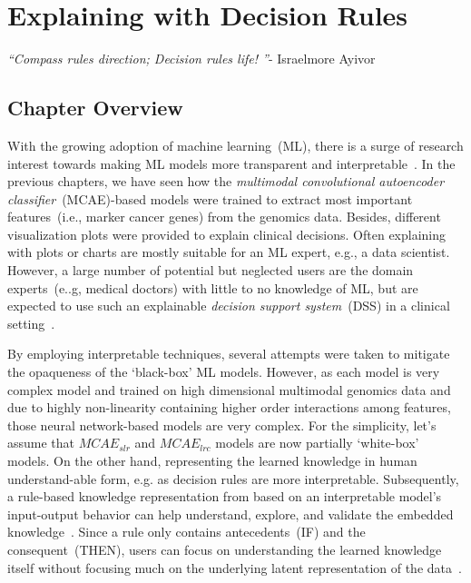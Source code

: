 \chapter{Explaining with Decision Rules}\label{chapter:xai_rules}
\textit{``Compass rules direction; Decision rules life! ''}- Israelmore Ayivor

\section{Chapter Overview} \label{chapter_7:cw}
With the growing adoption of machine learning~(ML), there is a surge of research interest towards making ML models more transparent and interpretable~\cite{ming2018rulematrix}. In the previous chapters, we have seen how the \textit{multimodal convolutional autoencoder classifier}~(MCAE)-based models were trained to extract most important features~(i.e., marker cancer genes) from the genomics data. Besides, different visualization plots were provided to explain clinical decisions. Often explaining with plots or charts are mostly suitable for an ML expert, e.g., a data scientist. However, a large number of potential but neglected users are the domain experts~(e..g, medical doctors) with little to no knowledge of ML, but are expected to use such an explainable \textit{decision support system}~(DSS) in a clinical setting~\cite{ming2018rulematrix}.


\hspace*{3.5mm} By employing interpretable techniques, several attempts were taken to mitigate the opaqueness of the `black-box' ML models. However, as each model is very complex model and trained on high dimensional multimodal genomics data and due to highly non-linearity containing higher order interactions among features, those neural network-based models are very complex. For the simplicity, let's assume that $MCAE_{slr}$ and $MCAE_{lrc}$ models are now partially `white-box' models. 
On the other hand, representing the learned knowledge in human understand-able form, e.g. as decision rules are more interpretable. Subsequently, a rule-based knowledge representation from based on an interpretable model's input-output behavior can help understand, explore, and validate the embedded knowledge~\cite{ming2018rulematrix}. Since a rule only contains antecedents~(IF) and the consequent~(THEN), users can focus on understanding the learned knowledge itself without focusing much on the underlying latent representation of the data~\cite{ming2018rulematrix}. 

